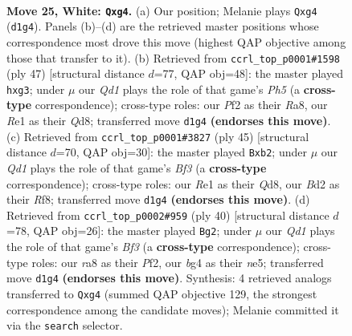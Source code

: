 \documentclass[11pt]{article}
\begin{document}
\clearpage

\begin{figure}[p]\centering
\begin{subfigure}{0.46\textwidth}\centering
\resizebox{\linewidth}{!}{%
\newchessgame
\chessboard[
  setfen={rn2r1k1/pp2qppp/8/2P1P3/6b1/P5P1/1P1B1P2/1BRQR1K1 w - - 0 25},
  showmover=false,
  pgfstyle=straightmove, color=movearrow, markmove={d1-g4}
]}
\caption{}
\end{subfigure}\hfill
\begin{subfigure}{0.46\textwidth}\centering
\resizebox{\linewidth}{!}{%
\newchessgame
\chessboard[
  setfen={r2qr1k1/n4p2/B1bp2p1/8/3QP2p/6P1/PP1N1P2/R1R3K1 b - - 1 24},
  showmover=false,
  pgfstyle=straightmove, color=movearrow, markmove={h4-g3}
]}
\caption{}
\end{subfigure}
\\[4pt]
\begin{subfigure}{0.46\textwidth}\centering
\resizebox{\linewidth}{!}{%
\newchessgame
\chessboard[
  setfen={3q1rk1/5p2/p1r2bp1/1p1p3p/8/PP2P2P/RB3PP1/1Q1R2K1 b - - 1 23},
  showmover=false,
  pgfstyle=straightmove, color=movearrow, markmove={f6-b2}
]}
\caption{}
\end{subfigure}\hfill
\begin{subfigure}{0.46\textwidth}\centering
\resizebox{\linewidth}{!}{%
\newchessgame
\chessboard[
  setfen={2rr2k1/pp3ppp/4q3/3pn3/7P/2P1PBP1/P4P2/2RQ1RK1 w - - 1 21},
  showmover=false,
  pgfstyle=straightmove, color=movearrow, markmove={f3-g2}
]}
\caption{}
\end{subfigure}
\caption{\textbf{Move 25, White: \texttt{Qxg4}.} (a) Our position; Melanie plays \texttt{Qxg4} (\texttt{d1g4}). Panels (b)--(d) are the retrieved master positions whose correspondence most drove this move (highest QAP objective among those that transfer to it). (b) Retrieved from \texttt{ccrl\_top\_p0001\#1598} (ply 47) [structural distance $d$=77, QAP obj=48]: the master played \texttt{hxg3}; under $\mu$ our \emph{Qd1} plays the role of that game's \emph{Ph5} (a \textbf{cross-type} correspondence); cross-type roles: our \emph{P}f2 as their \emph{R}a8, our \emph{R}e1 as their \emph{Q}d8; transferred move \texttt{d1g4} \textbf{(endorses this move)}. (c) Retrieved from \texttt{ccrl\_top\_p0001\#3827} (ply 45) [structural distance $d$=70, QAP obj=30]: the master played \texttt{Bxb2}; under $\mu$ our \emph{Qd1} plays the role of that game's \emph{Bf3} (a \textbf{cross-type} correspondence); cross-type roles: our \emph{R}e1 as their \emph{Q}d8, our \emph{B}d2 as their \emph{R}f8; transferred move \texttt{d1g4} \textbf{(endorses this move)}. (d) Retrieved from \texttt{ccrl\_top\_p0002\#959} (ply 40) [structural distance $d$=78, QAP obj=26]: the master played \texttt{Bg2}; under $\mu$ our \emph{Qd1} plays the role of that game's \emph{Bf3} (a \textbf{cross-type} correspondence); cross-type roles: our \emph{r}a8 as their \emph{P}f2, our \emph{b}g4 as their \emph{n}e5; transferred move \texttt{d1g4} \textbf{(endorses this move)}. Synthesis: 4 retrieved analogs transferred to \texttt{Qxg4} (summed QAP objective 129, the strongest correspondence among the candidate moves); Melanie committed it via the \texttt{search} selector.}
\label{fig:thought-m48}
\end{figure}
\end{document}
